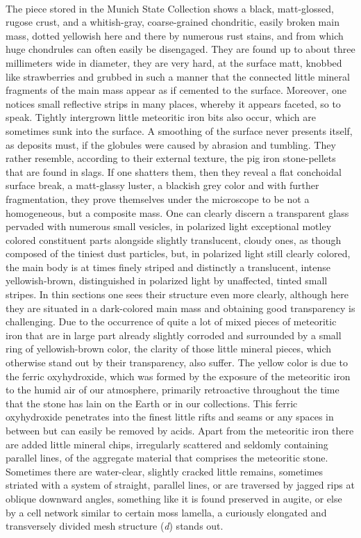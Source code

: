 \documentclass[a4paper, 12pt, oneside]{article}
\begin{document}
\paragraph*{}
The piece stored in the Munich State Collection shows a black, matt-glossed, rugose crust, and a whitish-gray, coarse-grained chondritic, easily broken main mass, dotted yellowish here and there by numerous rust stains, and from which huge chondrules can often easily be disengaged. They are found up to about three millimeters wide in diameter, they are very hard, at the surface matt, knobbed like strawberries and grubbed in such a manner that the connected little mineral fragments of the main mass appear as if cemented to the surface. Moreover, one notices small reflective strips in many places, whereby it appears faceted, so to speak. Tightly intergrown little meteoritic iron bits also occur, which are sometimes sunk into the surface. A smoothing of the surface never presents itself, as deposits must, if the globules were caused by abrasion and tumbling. They rather resemble, according to their external texture, the pig iron stone-pellets that are found in slags. If one shatters them, then they reveal a flat conchoidal surface break, a matt-glassy luster, a blackish grey color and with further fragmentation, they prove themselves under the microscope to be not a homogeneous, but a composite mass. One can clearly discern a transparent glass pervaded with numerous small vesicles, in polarized light exceptional motley colored constituent parts alongside slightly translucent, cloudy ones, as though composed of the tiniest dust particles, but, in polarized light still clearly colored, the main body is at times finely striped and distinctly a translucent, intense yellowish-brown, distinguished in polarized light by unaffected, tinted small stripes. In thin sections one sees their structure even more clearly, although here they are situated in a dark-colored main mass and obtaining good transparency is challenging. Due to the occurrence of quite a lot of mixed pieces of meteoritic iron that are in large part already slightly corroded and surrounded by a small ring of yellowish-brown color, the clarity of those little mineral pieces, which otherwise stand out by their transparency, also suffer. The yellow color is due to the ferric oxyhydroxide, which was formed by the exposure of the meteoritic iron to the humid air of our atmosphere, primarily retroactive throughout the time that the stone has lain on the Earth or in our collections. This ferric oxyhydroxide penetrates into the finest little rifts and seams or any spaces in between but can easily be removed by acids. Apart from the meteoritic iron there are added little mineral chips, irregularly scattered and seldomly containing parallel lines, of the aggregate material that comprises the meteoritic stone. Sometimes there are water-clear, slightly cracked little remains, sometimes striated with a system of straight, parallel lines, or are traversed by jagged rips at oblique downward angles, something like it is found preserved in augite, or else by a cell network similar to certain moss lamella, a curiously elongated and transversely divided mesh structure (\emph{d}) stands out. 
\end{document}
